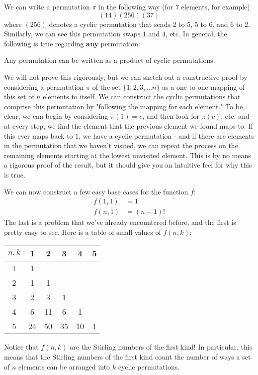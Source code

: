 \documentclass[11pt,twosided]{article}
\begin{document}
\begin{remark}[]
We can write a permutation $\pi$ in the following way (for 7 elements, for example) 
\[
	(14) (256) (37)
\]
where $(256)$ denotes a cyclic permutation that sends $2$ to $5$, $5$ to $6$, and $6$ to $2$. Similarly, we can see this permutation swaps $1$ and $4$, etc. In general, the following is true regarding \textbf{any} permutation: 
\begin{theorem}
	Any permutation can be written as a product of cyclic permutations. 
\end{theorem}
We will not prove this rigorously, but we can sketch out a constructive proof by considering a permutation $\pi$ of the set $\{ 1, 2, 3, \ldots n \}$ as a one-to-one mapping of this set of $n$ elements to itself. We can construct the cyclic permutations that comprise this permutation by "following the mapping for each element." To be clear, we can begin by considering $\pi(1) = c$, and then look for $\pi(c)$, etc. and at every step, we find the element that the previous element we found maps to. If this ever maps back to $1$, we have a cyclic permutation - and if there are elements in the permutation that we haven't visited, we can repeat the process on the remaining elements starting at the lowest unvisited element. This is by no means a rigorous proof of the result, but it should give you an intuitive feel for why this is true. 
\end{remark}
We can now construct a few easy base cases for the function $f$: 
\begin{align*}
f(1, 1) &= 1 \\
f(n, 1) &= (n-1)!
\end{align*}
The last is a problem that we've already encountered before, and the first is pretty easy to see. Here is a table of small values of $f(n, k)$: 
\begin{center}
\begin{tabular}{c | c c c c c}
$n, k$ & 1 & 2 & 3 & 4 & 5 \\ \hline 
1 & 1 & & & & \\
2 & 1 & 1 & & &  \\
3 & 2 & 3 & 1 & &  \\
4 & 6 & 11 & 6 & 1 & \\
5 & 24 & 50 & 35 & 10 & 1 \\
\end{tabular}
\end{center}
Notice that $f(n, k)$ are the Stirling numbers of the first kind! In particular, this means that the Stirling numbers of the first kind count the number of ways a set of $n$ elements can be arranged into $k$ cyclic permutations. 
\end{document}
